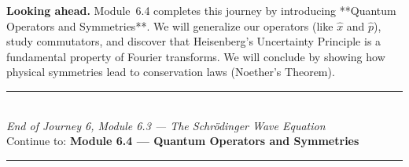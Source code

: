 \documentclass[12pt, a4paper, twoside]{book}
\begin{document}
\medskip
\noindent\textbf{Looking ahead.}
Module~6.4 completes this journey by introducing **Quantum Operators and Symmetries**. We will generalize our operators (like $\hat{x}$ and $\hat{p}$), study commutators, and discover that Heisenberg's Uncertainty Principle is a fundamental property of Fourier transforms. We will conclude by showing how physical symmetries lead to conservation laws (Noether's Theorem).

\vspace{1.4cm}
\begin{center}
{\color{teal}\rule{0.5\linewidth}{0.8pt}}\\[6pt]
{\small\color{deep}\textit{End of Journey 6, Module 6.3 --- The Schrödinger Wave Equation}}\\[4pt]
{\small\color{deep}Continue to: \textbf{Module 6.4 --- Quantum Operators and Symmetries}}\\[6pt]
{\color{teal}\rule{0.5\linewidth}{0.8pt}}
\end{center}
\end{document}
